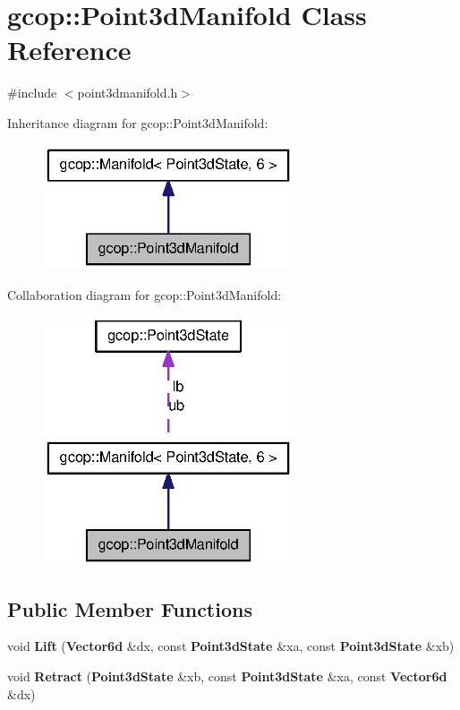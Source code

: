 \section{gcop\-:\-:\-Point3d\-Manifold \-Class \-Reference}
\label{classgcop_1_1Point3dManifold}


{\ttfamily \#include $<$point3dmanifold.\-h$>$}



\-Inheritance diagram for gcop\-:\-:\-Point3d\-Manifold\-:
\nopagebreak
\begin{figure}[H]
\begin{center}
\leavevmode
\includegraphics[width=210pt]{classgcop_1_1Point3dManifold__inherit__graph}
\end{center}
\end{figure}


\-Collaboration diagram for gcop\-:\-:\-Point3d\-Manifold\-:
\nopagebreak
\begin{figure}[H]
\begin{center}
\leavevmode
\includegraphics[width=210pt]{classgcop_1_1Point3dManifold__coll__graph}
\end{center}
\end{figure}
\subsection*{\-Public \-Member \-Functions}
\begin{DoxyCompactItemize}
\item 
void {\bf \-Lift} ({\bf \-Vector6d} \&dx, const {\bf \-Point3d\-State} \&xa, const {\bf \-Point3d\-State} \&xb)
\item 
void {\bf \-Retract} ({\bf \-Point3d\-State} \&xb, const {\bf \-Point3d\-State} \&xa, const {\bf \-Vector6d} \&dx)
\end{DoxyCompactItemize}
